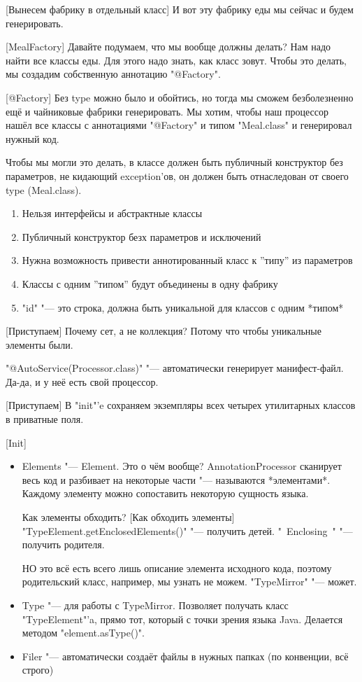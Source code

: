 [Вынесем фабрику в отдельный класс]
И вот эту фабрику еды мы сейчас и будем генерировать.

[MealFactory]
Давайте подумаем, что мы вообще должны делать?
Нам надо найти все классы еды.
Для этого надо знать, как класс зовут.
Чтобы это делать, мы создадим собственную аннотацию \java"@Factory".

[@Factory]
Без type можно было и обойтись, но тогда мы сможем безболезненно ещё и чайниковые фабрики генерировать.
Мы хотим, чтобы наш процессор нашёл все классы с аннотациями \java"@Factory" и типом \java"Meal.class" и генерировал нужный код.

Чтобы мы могли это делать, в классе должен быть публичный конструктор без параметров, не кидающий exception'ов, он должен быть отнаследован от своего type (Meal.class). 
\begin{enumerate}
\item
Нельзя интерфейсы и абстрактные классы
\item
Публичный конструктор безх параметров и исключений
\item
Нужна возможность привести аннотированный класс к ''типу'' из параметров
\item
Классы с одним ''типом'' будут объединены в одну фабрику
\item
\java"id" "--- это строка, должна быть уникальной для классов с одним *типом*
\end{enumerate}

[Приступаем]
Почему сет, а не коллекция? Потому что чтобы уникальные элементы были.

\java"@AutoService(Processor.class)" "--- автоматически генерирует манифест-файл. 
Да-да, и у неё есть свой процессор.

[Приступаем]
В \java"init"'e сохраняем экземпляры всех четырех утилитарных классов в приватные поля.

[Init]
\begin{itemize}
\item
Elements "--- Element.
Это о чём вообще?
AnnotationProcessor сканирует весь код и разбивает на некоторые части "--- называются *элементами*.
Каждому элементу можно сопоставить некоторую сущность языка.

Как элементы обходить? 
[Как обходить элементы]
\java"TypeElement.getEnclosedElements()" "--- получить детей.
\java"~Enclosing~" "--- получить родителя.

НО это всё есть всего лишь описание элемента исходного кода, 
поэтому родительский класс,
например, мы узнать не можем. \java"TypeMirror" "--- может.
\item
Type "--- для работы с TypeMirror.
Позволяет получать класс \java"TypeElement"'a, прямо тот, который с точки зрения языка Java. Делается методом \java"element.asType()".
\item
Filer "--- автоматически создаёт файлы в нужных папках (по конвенции, всё строго)
\end{itemize}

